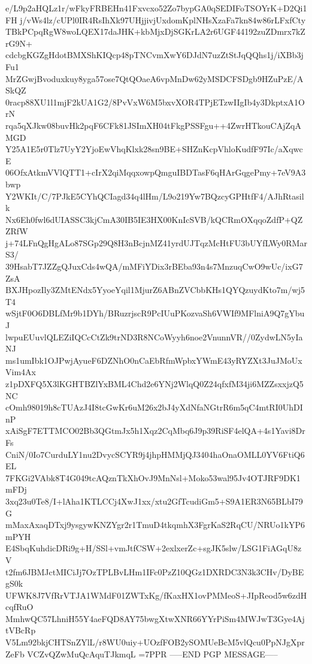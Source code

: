 e/L9p2aHQLz1r/wFkyFRBEHn41Fxvcxo52Zo7bypGA0qSEDIFoTSOYrK+D2Qi1FH
j/vWs4lz/cUPl0IR4RsIhXk97UHjjivjUxdomKplNHsXzaFa7kn84w86rLFxfCty
TBkPCpqRgW8woLQEX17daJHK+kbMjxDjSGKrLA2r6UGF44192zuZDmrx7kZrG9N+
cdcbgKGZgHdotBMXShKIQcp48pTNCvmXwY6DJdN7uzZtStJqQQhs1j/iXBb3jFu1
MrZGwjBvoduxkuy8yga57ose7QtQOaeA6vpMnDw62yMSDCFSDgb9HZuPzE/ASkQZ
0racp88XU1l1mjF2kUA1G2/8PvVxW6M5bxvXOR4TPjETzwIIgIb4y3DkptxA1OrN
rqa5qXJkw08buvHk2pqF6CFk81JSImXH04tFkgPSSFgu++4ZwrHTkouCAjZqAMGD
Y25A1E5r0Tlz7UyY2YjoEwVhqKlxk28sn9BE+SHZnKcpVhloKudfF97Ic/aXqwcE
06OfxAtkmVVlQTT1+cIrX2qiMqqxowpQmguIBDTasF6qHArGqgePmy+7eV9A3bwp
Y2WKIt/C/7PJkE5CYhQCIagd34q4lHm/L9o219Yw7BQzcyGPHtfF4/AJhRtasilk
Nx6Eh0fwl6dUIASSC3kjCmA30IB5IE3HX00KnIcSVB/kQCRmOXqqoZdfP+QZZRfW
j+74LFnQgHgALo87SGp29Q8H3nBcjnMZ41yrdUJTqzMcHtFU3bUYfLWy0RMarS3/
39HsabT7JZZgQJuxCds4wQA/mMFiYDix3rBEba93n4s7MnzuqCwO9wUc/ixG7ZsA
BXJHpozIly3ZMtENdx5YyoeYqil1MjurZ6ABnZVCbbKHs1QYQzuydKto7m/wj5T4
wSjtF0O6DBLfMr9b1DYh/BRuzrjscR9PcIUuPKozvaSh6VWIf9MFlniA9Q7gYbuJ
lwpuEUuvlQLEZiIQCcCtZk9trND3R8NCoWyyh6noe2VnunnVR//0ZydwLN5yIaNJ
ms1umIbk1OJPwjAyueF6DZNhO0nCaEbRfmWpbxYWmE43yRYZXt3JuJMoUxVim4Ax
z1pDXFQ5X3lKGHTBZlYxBML4Chd2e6YNj2WlqQ0Z24qfxfM34ji6MZZsxxjzQ5NC
cOmh98019h8cTUAzJ4I8tcGwKr6uM26x2bJ4yXdNfaNGtrR6m5qC4mtRI0UhDInP
xAiSgF7ETTMCO02Bb3QGtmJx5h1Xqz2CqMbq6J9p39RiSF4elQA+4s1Yavi8DrFs
CniN/0Io7CurduLY1nu2DvycSCYR9j4jhpHMMjQJ3404haOnaOMLL0YV6FtiQ6EL
7FKGi2VAbk8T4G049tcAQznTkXhOvJ9MnNsl+Moko53wal95Jv4OTJRF9DK1mFDj
3xq23u0Te8/I+lAha1KTLCCj4XwJ1xx/xtu2GfTcudiGm5+S9A1ER3N65BLbI79G
mMaxAxaqDTxj9ysgywKNZYgr2r1TmuD4tkqmhX3FgrKaS2RqCU/NRUo1kYP6mPYH
E4SbqKuhdicDRi9g+H/SSl+vmJtfCSW+2exlxerZc+sgJK5slw/LSG1FiAGqU8zV
t2fm6JBMJctMICiJj7OzTPLBvLHm1IFc0PzZ10QGz1DXRDC3N3k3CHv/DyBEgS0k
UFWK8J7VfRrVTJA1WMdF01ZWTxKg/fKaxHX1ovPMMeoS+JIpReod5w6zdHcqfRuO
MmhwQC57LhniH55Y4aeFQD8AY75bwgXtwXNR66YYrPiSm4MWJwT3Gye4AjtVBcRp
V5Lm92bkjCHTSnZYlL/r8WU0uiy+UOzfFOB2ySOMUeBcM5vlQcu0PpNJgXprZeFb
VCZvQZwMuQcAquTJkmqL
=7PPR
-----END PGP MESSAGE-----
